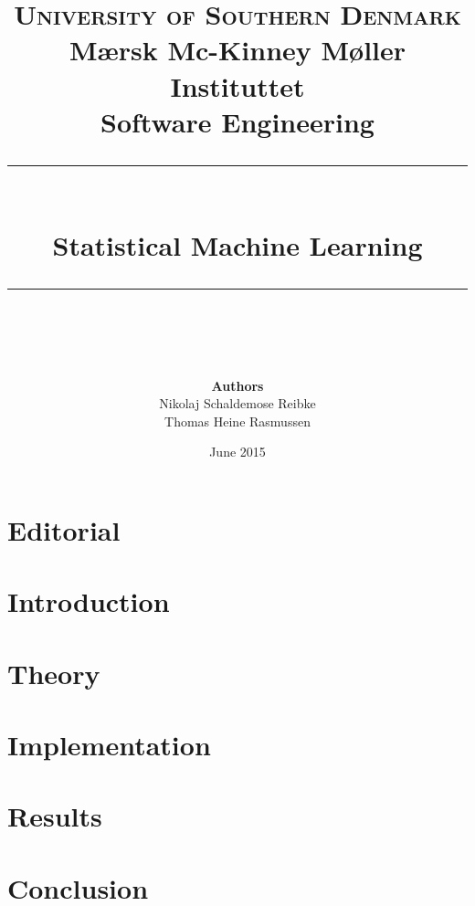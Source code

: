 \documentclass[11pt]{article}
\newcommand{\romanTitle}[1]{\MakeUppercase{\thepage}\hspace{0.2cm}#1}
\begin{document}
\title {
	\textsc{\LARGE University of Southern Denmark}\\
	\large Mærsk Mc-Kinney Møller Instituttet\\[1cm]
	\Large Software Engineering\\
	\rule{\linewidth}{0.4pt}\\[0.4cm]Statistical Machine Learning\\\rule{\linewidth}{0.4pt}\\[0.5cm] }

\author{ 
	\textbf{Authors}\\Nikolaj Schaldemose Reibke\\Thomas Heine Rasmussen
}
\date{\vfill June 2015}
\maketitle
\thispagestyle{empty}
\clearpage
\setcounter{page}{1}

\pagestyle{fancy}
\setlength{\headheight}{25.2pt} 


\rfoot{}
\cfoot{\MakeUppercase{\thepage}}
\lfoot{}

\section*{Editorial}


\renewcommand\contentsname{\romanTitle{Table of contents}}
\tableofcontents
\newpage

\setcounter{page}{1}
\rfoot{}
\lfoot{}

\section{Introduction}


\section{Theory}


\section{Implementation}


\section{Results}


\section{Conclusion}

\end{document}
